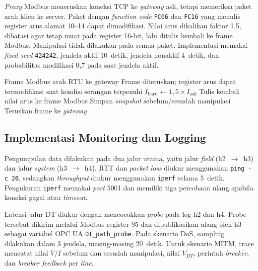 \textit{Proxy} Modbus meneruskan koneksi TCP ke \textit{gateway} asli, tetapi memeriksa paket arah klien ke server. Paket dengan \textit{function code} \texttt{FC06} dan \texttt{FC16} yang menulis register arus alamat 10--14 dapat dimodifikasi. Nilai arus dikalikan faktor 1{,}5, dibatasi agar tetap muat pada register 16-bit, lalu ditulis kembali ke frame Modbus. Manipulasi tidak dilakukan pada semua paket. Implementasi memakai \textit{fixed seed} \texttt{424242}, jendela aktif 10~detik, jendela nonaktif 4~detik, dan probabilitas modifikasi 0{,}7 pada saat jendela aktif. 

\begin{algorithm}[H]
\caption{Logika manipulasi paket Modbus pada skenario \ac{MITM}}
\begin{compactalgorithmic}[1]
\Require Frame Modbus arah RTU ke gateway
\Ensure Frame diteruskan; register arus dapat termodifikasi saat kondisi serangan terpenuhi
            \State $I_{\text{baru}} \leftarrow 1{,}5 \times I_{\text{asli}}$
            \State Tulis kembali nilai arus ke frame Modbus
        \EndIf
        \State Simpan \textit{snapshot} sebelum/sesudah manipulasi
    \EndIf
\EndIf
\State Teruskan frame ke \textit{gateway}
\end{compactalgorithmic}
\end{algorithm}

\subsection{Implementasi Monitoring dan Logging}
\label{subsec:implementasi_monitoring_dan_logging}
Pengumpulan data dilakukan pada dua jalur utama, yaitu jalur \textit{field} (h2~$\rightarrow$~h3) dan jalur \textit{system} (h3~$\rightarrow$~h4). \ac{RTT} dan \textit{packet loss} diukur menggunakan \texttt{ping -c 20}, sedangkan \textit{throughput} diukur menggunakan \texttt{iperf} selama 5~detik. Pengukuran \texttt{iperf} memakai \textit{port} 5001 dan memiliki tiga percobaan ulang apabila koneksi gagal atau \textit{timeout}.

Latensi jalur \ac{DT} diukur dengan mencocokkan \textit{probe} pada log h2 dan h4. Probe tersebut dikirim melalui Modbus register 95 dan dipublikasikan ulang oleh h3 sebagai variabel OPC UA \texttt{DT\_path\_probe}. Pada skenario \ac{DoS}, sampling dilakukan dalam 3 jendela, masing-masing 20~detik. Untuk skenario \ac{MITM}, trace mencatat nilai $V/I$ sebelum dan sesudah manipulasi, nilai $V_{DT}$, perintah \textit{breaker}, dan \textit{breaker feedback} per \textit{line}.

